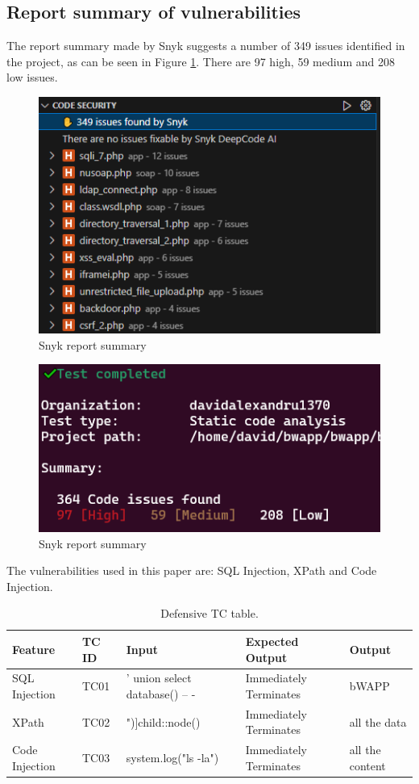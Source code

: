 \documentclass{article}
\begin{document}
\subsection{Report summary of vulnerabilities}
The report summary made by Snyk suggests a number of 349 issues identified in the project, as can be seen in Figure \ref{fig:snyk-report-summary}. There are 97 high, 59 medium and 208 low issues.
\begin{figure}[H]
    \centering
    \includegraphics[width=0.5\linewidth]{Figures/defensive/issues.PNG}
    \caption{Snyk report summary}
    \label{fig:snyk-report-summary}
\end{figure}
\begin{figure}[H]
    \centering
    \includegraphics[width=0.5\linewidth]{Figures/defensive/all-issues.PNG}
    \caption{Snyk report summary}
    \label{fig:snyk-report-summary2}
\end{figure}
\par The vulnerabilities used in this paper are: SQL Injection, XPath and Code Injection.
\begin{table} [H]
    \centering
    \begin{tabular}{l|l|l|l|l}
        Feature        & TC ID & Input                          & Expected Output        & Output          \\ \hline
        SQL Injection  & TC01  & ' union select database() -- - & Immediately Terminates & bWAPP           \\
        XPath          & TC02  & ")]child::node()               & Immediately Terminates & all the data    \\
        Code Injection & TC03  & system.log("ls -la")           & Immediately Terminates & all the content \\
    \end{tabular}
    \caption{\label{tab:TC-defensive}Defensive TC table.}
\end{table}
\end{document}
